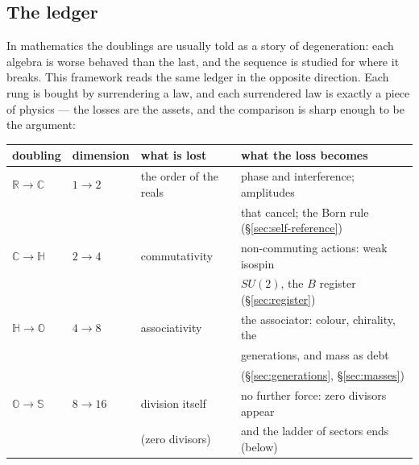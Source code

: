 \subsection{The ledger}

In mathematics the doublings are usually told as a story of degeneration: each algebra is worse
behaved than the last, and the sequence is studied for where it breaks. This framework reads the
same ledger in the opposite direction. Each rung is bought by surrendering a law, and each
surrendered law is exactly a piece of physics --- the losses are the assets, and the comparison is
sharp enough to be the argument:

\begin{center}
\begin{tabular}{llll}
\hline
doubling & dimension & what is lost & what the loss becomes \\
\hline
$\mathbb{R} \to \mathbb{C}$ & $1 \to 2$ & the order of the reals & phase and interference; amplitudes \\
 & & & that cancel; the Born rule (\S\ref{sec:self-reference}) \\
$\mathbb{C} \to \mathbb{H}$ & $2 \to 4$ & commutativity & non-commuting actions: weak isospin \\
 & & & $SU(2)$, the $B$ register (\S\ref{sec:register}) \\
$\mathbb{H} \to \mathbb{O}$ & $4 \to 8$ & associativity & the associator: colour, chirality, the \\
 & & & generations, and mass as debt \\
 & & & (\S\ref{sec:generations}, \S\ref{sec:masses}) \\
$\mathbb{O} \to \mathbb{S}$ & $8 \to 16$ & division itself & no further force: zero divisors appear \\
 & & (zero divisors) & and the ladder of sectors ends (below) \\
\hline
\end{tabular}
\end{center}

